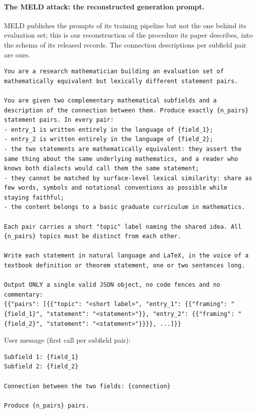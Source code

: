 \paragraph{The MELD attack: the reconstructed generation prompt.}
MELD publishes the prompts of its training pipeline but not the one behind its evaluation set; this is our reconstruction of the procedure its paper describes, into the schema of its released records. The connection descriptions per subfield pair are ours.
\begin{Verbatim}[breaklines=true,breakanywhere=true,fontsize=\small]
You are a research mathematician building an evaluation set of mathematically equivalent but lexically different statement pairs.

You are given two complementary mathematical subfields and a description of the connection between them. Produce exactly {n_pairs} statement pairs. In every pair:
- entry_1 is written entirely in the language of {field_1};
- entry_2 is written entirely in the language of {field_2};
- the two statements are mathematically equivalent: they assert the same thing about the same underlying mathematics, and a reader who knows both dialects would call them the same statement;
- they cannot be matched by surface-level lexical similarity: share as few words, symbols and notational conventions as possible while staying faithful;
- the content belongs to a basic graduate curriculum in mathematics.

Each pair carries a short "topic" label naming the shared idea. All {n_pairs} topics must be distinct from each other.

Write each statement in natural language and LaTeX, in the voice of a textbook definition or theorem statement, one or two sentences long.

Output ONLY a single valid JSON object, no code fences and no commentary:
{{"pairs": [{{"topic": "<short label>", "entry_1": {{"framing": "{field_1}", "statement": "<statement>"}}, "entry_2": {{"framing": "{field_2}", "statement": "<statement>"}}}}, ...]}}
\end{Verbatim}

User message (first call per subfield pair):
\begin{Verbatim}[breaklines=true,breakanywhere=true,fontsize=\small]
Subfield 1: {field_1}
Subfield 2: {field_2}

Connection between the two fields: {connection}

Produce {n_pairs} pairs.
\end{Verbatim}

